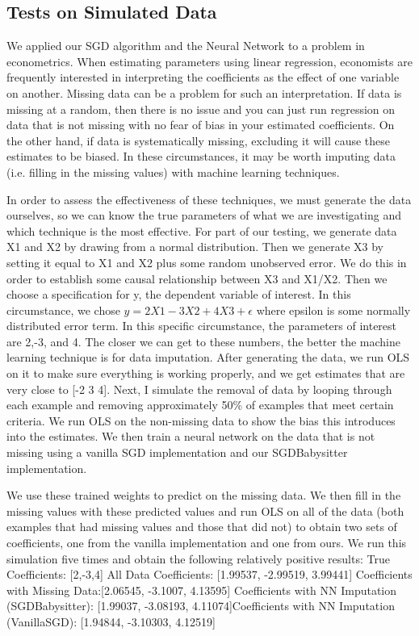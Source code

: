 \documentclass{article}
\begin{document}
\subsection{Tests on Simulated Data}
We applied our SGD algorithm and the Neural Network to a problem in econometrics. When estimating parameters using linear regression, economists are frequently interested in interpreting the coefficients as the effect of one variable on another. Missing data can be a problem for such an interpretation. If data is missing at a random, then there is no issue and you can just run regression on data that is not missing with no fear of bias in your estimated coefficients. On the other hand, if data is systematically missing, excluding it will cause these estimates to be biased.  In these circumstances, it may be worth imputing data (i.e. filling in the missing values) with machine learning techniques. 
\par In order to assess the effectiveness of these techniques, we must generate the data ourselves, so we can know the true parameters of what we are investigating and which technique is the most effective. 
For part of our testing, we generate data X1 and X2 by drawing from a normal distribution. Then we generate X3 by setting it equal to X1 and X2 plus some random unobserved error. We do this in order to establish some causal relationship between X3 and X1/X2.  Then we choose a specification for y, the dependent variable of interest. In this circumstance, we chose $y=2X1-3X2+4X3 +\epsilon$ where epsilon is some normally distributed error term.  In this specific circumstance, the parameters of interest are 2,-3, and 4. The closer we can get to these numbers, the better the machine learning technique is for data imputation. 
After generating the data, we run OLS on it to make sure everything is working properly, and we get estimates that are very close to [-2 3 4]. Next, I simulate the removal of data by looping through each example and removing approximately 50\% of examples that meet certain criteria.   We run OLS on the non-missing data to show the bias this introduces into the estimates. We then train a neural network on the data that is not missing using a vanilla SGD implementation and our SGDBabysitter implementation.  
\par We use these trained weights to predict on the missing data. We then fill in the missing values with these predicted values and run OLS on all of the data (both examples that had missing values and those that did not) to obtain two sets of coefficients, one from the vanilla implementation and one from ours.  We run this simulation five times and obtain the following relatively positive results:
True Coefficients: [2,-3,4] \newline
All Data Coefficients: [1.99537, -2.99519, 3.99441] \newline
Coefficients with Missing Data:[2.06545, -3.1007, 4.13595] \newline
Coefficients with NN Imputation (SGDBabysitter): [1.99037, -3.08193, 4.11074]\newline Coefficients with NN Imputation (VanillaSGD): [1.94844, -3.10303, 4.12519]
\end{document}
